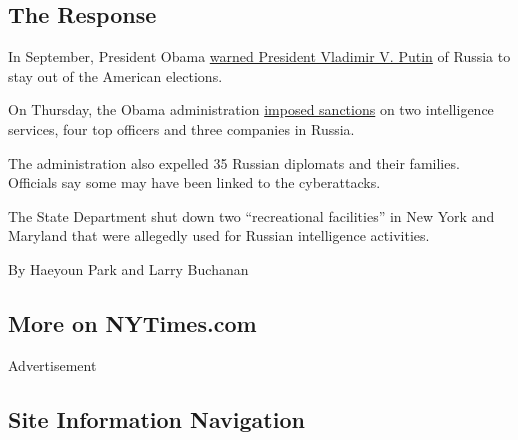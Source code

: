 \hypertarget{the-response}{%
\subsection{The Response}\label{the-response}}

In September, President Obama
\href{https://www.nytimes3xbfgragh.onion/2016/12/16/us/politics/obama-putin-hacking-news-conference.html}{warned
President Vladimir V. Putin} of Russia to stay out of the American
elections.

On Thursday, the Obama administration
\href{https://www.nytimes3xbfgragh.onion/2016/12/29/us/politics/russia-election-hacking-sanctions.html}{imposed
sanctions} on two intelligence services, four top officers and three
companies in Russia.

The administration also expelled 35 Russian diplomats and their
families. Officials say some may have been linked to the cyberattacks.

The State Department shut down two ``recreational facilities'' in New
York and Maryland that were allegedly used for Russian intelligence
activities.

By Haeyoun Park and Larry Buchanan

\hypertarget{more-on-nytimescom}{%
\subsection{More on NYTimes.com}\label{more-on-nytimescom}}

Advertisement

\hypertarget{site-information-navigation}{%
\subsection{Site Information
Navigation}\label{site-information-navigation}}

